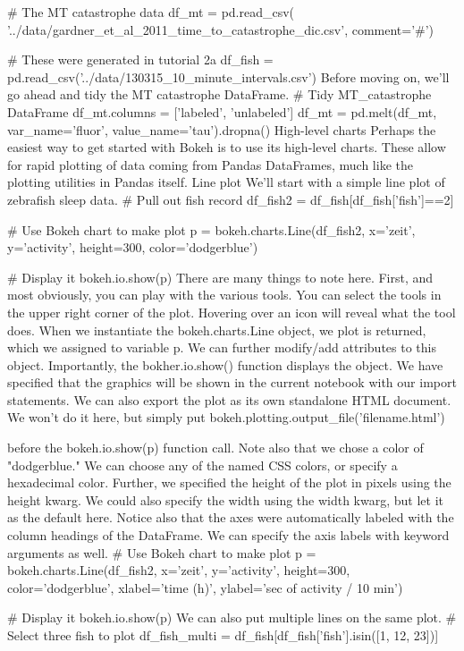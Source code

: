 # The MT catastrophe data
df_mt = pd.read_csv(
    '../data/gardner_et_al_2011_time_to_catastrophe_dic.csv',
    comment='#')

# These were generated in tutorial 2a
df_fish = pd.read_csv('../data/130315_10_minute_intervals.csv')
Before moving on, we'll go ahead and tidy the MT catastrophe DataFrame.
# Tidy MT_catastrophe DataFrame
df_mt.columns = ['labeled', 'unlabeled']
df_mt = pd.melt(df_mt, var_name='fluor', value_name='tau').dropna()
High-level charts
Perhaps the easiest way to get started with Bokeh is to use its high-level charts. These allow for rapid plotting of data coming from Pandas DataFrames, much like the plotting utilities in Pandas itself.
Line plot
We'll start with a simple line plot of zebrafish sleep data.
# Pull out fish record
df_fish2 = df_fish[df_fish['fish']==2]

# Use Bokeh chart to make plot
p = bokeh.charts.Line(df_fish2, x='zeit', y='activity', height=300, 
                      color='dodgerblue')

# Display it
bokeh.io.show(p)
There are many things to note here. First, and most obviously, you can play with the various tools. You can select the tools in the upper right corner of the plot. Hovering over an icon will reveal what the tool does.
When we instantiate the  bokeh.charts.Line object, we plot is returned, which we assigned to variable p. We can further modify/add attributes to this object. Importantly, the bokher.io.show() function displays the object. We have specified that the graphics will be shown in the current notebook with our import statements. We can also export the plot as its own standalone HTML document. We won't do it here, but simply put
bokeh.plotting.output_file('filename.html')

before the bokeh.io.show(p) function call.
Note also that we chose a color of "dodgerblue." We can choose any of the named CSS colors, or specify a hexadecimal color. Further, we specified the height of the plot in pixels using the height kwarg. We could also specify the width using the width kwarg, but let it as the default here. Notice also that the axes were automatically labeled with the column headings of the DataFrame. We can specify the axis labels with keyword arguments as well.
# Use Bokeh chart to make plot
p = bokeh.charts.Line(df_fish2, x='zeit', y='activity', height=300,
                      color='dodgerblue', xlabel='time (h)', 
                      ylabel='sec of activity / 10 min')

# Display it
bokeh.io.show(p)
We can also put multiple lines on the same plot.
# Select three fish to plot
df_fish_multi = df_fish[df_fish['fish'].isin([1, 12, 23])]

